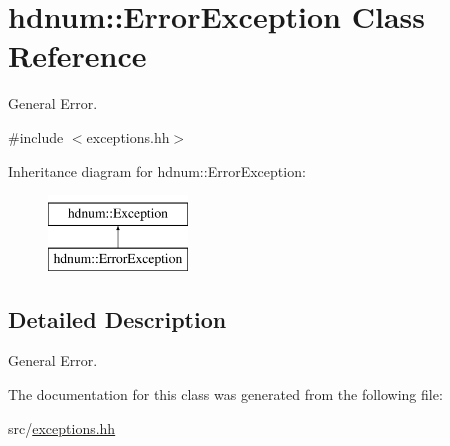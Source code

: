 \hypertarget{classhdnum_1_1ErrorException}{
\section{hdnum::ErrorException Class Reference}
\label{classhdnum_1_1ErrorException}
}


General Error.  




{\ttfamily \#include $<$exceptions.hh$>$}

Inheritance diagram for hdnum::ErrorException:\begin{figure}[H]
\begin{center}
\leavevmode
\includegraphics[height=2cm]{classhdnum_1_1ErrorException}
\end{center}
\end{figure}


\subsection{Detailed Description}
General Error. 

The documentation for this class was generated from the following file:\begin{DoxyCompactItemize}
\item 
src/\hyperlink{exceptions_8hh}{exceptions.hh}\end{DoxyCompactItemize}
